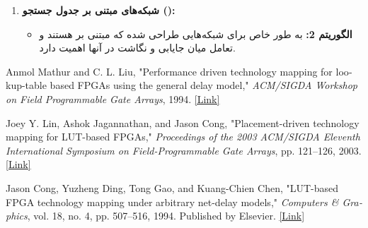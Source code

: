 \begin{qsolve}
\begin{enumerate}
\begin{enumerate}
			\item \textbf{شبکه‌های مبتنی بر جدول جستجو ():}
			\begin{itemize}
				\item \textbf{الگوریتم 2:}
				\newline
				به طور خاص برای شبکه‌هایی طراحی شده که مبتنی بر  هستند و تعامل میان جایابی و نگاشت در آنها اهمیت دارد.
			\end{itemize}
		\end{enumerate}
	\end{enumerate}
\end{qsolve}




\begin{latin}
	\begin{thebibliography}{9}
		Anmol Mathur and C. L. Liu, "Performance driven technology mapping for lookup-table based FPGAs using the general delay model," \textit{ACM/SIGDA Workshop on Field Programmable Gate Arrays}, 1994.
		\href{https://websrv.cecs.uci.edu/~papers/compendium94-03/papers/1994/fpga94/pdffiles/fpga94_3_1.pdf}{[Link]}
		
		
		
		Joey Y. Lin, Ashok Jagannathan, and Jason Cong, "Placement-driven technology mapping for LUT-based FPGAs," \textit{Proceedings of the 2003 ACM/SIGDA Eleventh International Symposium on Field-Programmable Gate Arrays}, pp. 121--126, 2003.
		\href{http://courses.ece.ubc.ca/583/papers/44.pdf}{[Link]}
		
		
		Jason Cong, Yuzheng Ding, Tong Gao, and Kuang-Chien Chen, "LUT-based FPGA technology mapping under arbitrary net-delay models," \textit{Computers \& Graphics}, vol. 18, no. 4, pp. 507--516, 1994. Published by Elsevier.
		\href{https://citeseerx.ist.psu.edu/document?repid=rep1&type=pdf&doi=9c76e1834bf43160d6a090ead16fede3c3214ee7}{[Link]}
		
		
		
		
		
		

		
		
		
		

	\end{thebibliography} 
\end{latin}
